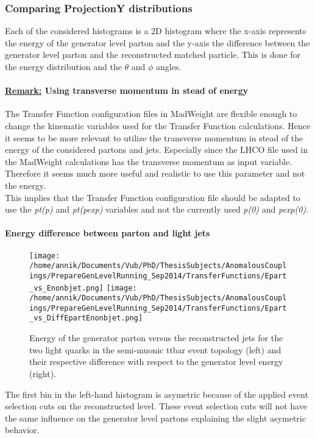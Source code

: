 \subsubsection{Comparing ProjectionY distributions}\label{subsubsec::FitRanges}
Each of the considered histograms is a 2D histogram where the x-axis represents the energy of the generator level parton and the y-axis the difference between the generator level parton and the reconstructed matched particle. This is done for the energy distribution and the $\theta$ and $\phi$ angles.

\paragraph{\underline{Remark:} Using transverse momentum in stead of energy\\}
The Transfer Function configuration files in MadWeight are flexible enough to change the kinematic variables used for the Transfer Function calculations. Hence it seems to be more relevant to utilize the transverse momentum in stead of the energy of the considered partons and jets. Especially since the LHCO file used in the MadWeight calculations has the transverse momentum as input variable. Therefore it seems much more useful and realistic to use this parameter and not the energy.\\
This implies that the Transfer Function configuration file should be adapted to use the \textit{pt(p)} and \textit{pt(pexp)} variables and not the currently used \textit{p(0)} and \textit{pexp(0)}.

\paragraph{Energy difference between parton and light jets\\}
\begin{figure}[!h]
  \centering
  \texttt{[image: /home/annik/Documents/Vub/PhD/ThesisSubjects/AnomalousCouplings/PrepareGenLevelRunning\_Sep2014/TransferFunctions/Epart\_vs\_Enonbjet.png]}
  \texttt{[image: /home/annik/Documents/Vub/PhD/ThesisSubjects/AnomalousCouplings/PrepareGenLevelRunning\_Sep2014/TransferFunctions/Epart\_vs\_DiffEpartEnonbjet.png]}
  \caption{Energy of the generator parton versus the reconstructed jets for the two light quarks in the semi-muonic ttbar event topology (left) and their respective difference with respect to the generator level energy (right).}
\end{figure}
The first bin in the left-hand histogram is asymetric because of the applied event selection cuts on the reconstructed level. These event selection cuts will not have the same influence on the generator level partons explaining the slight asymetric behavior.
\newpage

